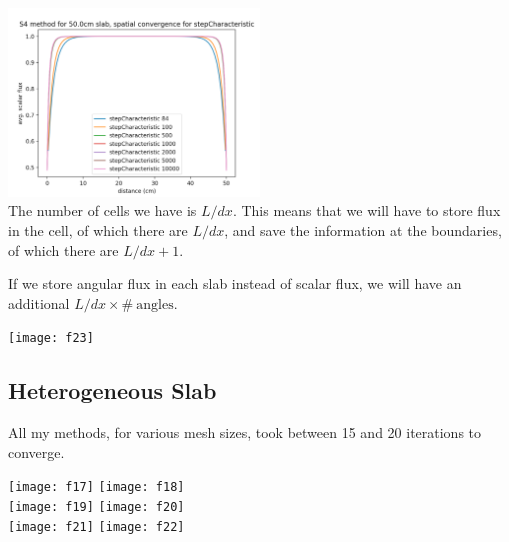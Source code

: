 \documentclass[a4paper]{article}
\begin{document}
\includegraphics[width=0.5\textwidth]{f13}\\

The number of cells we have is $L/dx$. This means that we will have to store flux in the cell, of which there are $L/dx$, and save the information at the boundaries, of which there are $L/dx + 1$.\par
If we store angular flux in each slab instead of scalar flux, we will have an additional $L/dx\times\#~\mbox{angles}$.\par

\texttt{[image: f23]}\\





\subsection*{Heterogeneous Slab}
All my methods, for various mesh sizes, took between 15 and 20 iterations to converge.\par
\texttt{[image: f17]}
\texttt{[image: f18]}\\
\texttt{[image: f19]}
\texttt{[image: f20]}\\
\texttt{[image: f21]}
\texttt{[image: f22]}\\
\end{document}
